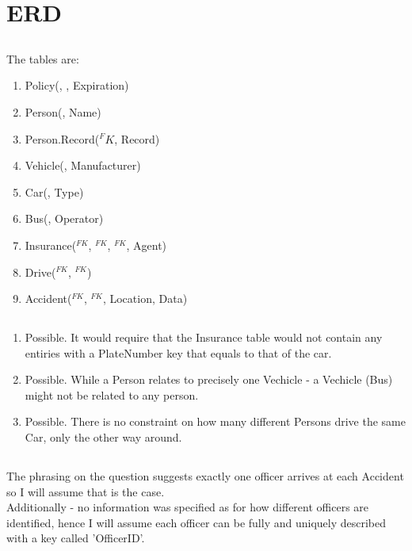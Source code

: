 \section{ERD}
\subsection{}
The tables are:
\begin{enumerate}
    \item Policy(, , Expiration)
    \item Person(, Name)
    \item Person.Record($^FK$, Record)
    \item Vehicle(, Manufacturer)
    \item Car(, Type)
    \item Bus(, Operator)
    \item Insurance($^{FK}$, $^{FK}$, $^{FK}$, Agent)
    \item Drive($^{FK}$, $^{FK}$)
    \item Accident($^{FK}$, $^{FK}$, Location, Data)
\end{enumerate}

\subsection{}
\begin{enumerate}
    \item Possible. It would require
    that the Insurance table would not contain any entiries
    with a PlateNumber key that equals to that of the car.
    \item Possible. While a Person relates to precisely
    one Vechicle - a Vechicle (Bus) might not be related
    to any person.
    \item Possible. There is no constraint on how many
    different Persons drive the same Car, only the other way around.
\end{enumerate}

\subsection{}
The phrasing on the question suggests exactly one officer
arrives at each Accident so I will assume that is the case.\\
Additionally - no information was specified as for how
different officers are identified, hence I will assume each officer
can be fully and uniquely described with a key called 'OfficerID'.\\

